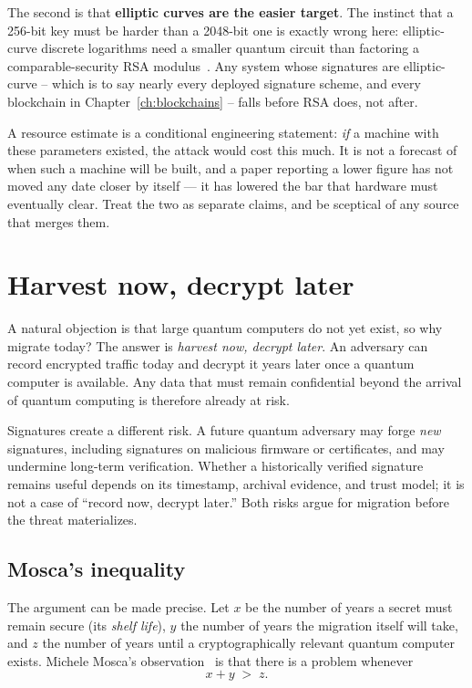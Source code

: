 The second is that \textbf{elliptic curves are the easier target}. The instinct
that a 256-bit key must be harder than a 2048-bit one is exactly wrong here:
elliptic-curve discrete logarithms need a smaller quantum circuit than factoring
a comparable-security RSA modulus~\cite{litinski2023}. Any system whose signatures
are elliptic-curve -- which is to say nearly every deployed signature scheme, and
every blockchain in Chapter~\ref{ch:blockchains} -- falls before RSA does, not
after.

\begin{remark}
A resource estimate is a conditional engineering statement: \emph{if} a machine
with these parameters existed, the attack would cost this much. It is not a
forecast of when such a machine will be built, and a paper reporting a lower
figure has not moved any date closer by itself --- it has lowered the bar that
hardware must eventually clear. Treat the two as separate claims, and be
sceptical of any source that merges them.
\end{remark}

\section{Harvest now, decrypt later}

A natural objection is that large quantum computers do not yet exist, so why migrate today? The answer is \emph{harvest now, decrypt later}. An adversary can record encrypted traffic today and decrypt it years later once a quantum computer is available. Any data that must remain confidential beyond the arrival of quantum computing is therefore already at risk.

Signatures create a different risk. A future quantum adversary may forge \emph{new} signatures, including signatures on malicious firmware or certificates, and may undermine long-term verification. Whether a historically verified signature remains useful depends on its timestamp, archival evidence, and trust model; it is not a case of ``record now, decrypt later.'' Both risks argue for migration before the threat materializes.

\subsection*{Mosca's inequality}

The argument can be made precise. Let $x$ be the number of years a secret must
remain secure (its \emph{shelf life}), $y$ the number of years the migration
itself will take, and $z$ the number of years until a cryptographically relevant
quantum computer exists. Michele Mosca's observation~\cite{mosca2025} is that
there is a problem whenever
\[
  x + y \;>\; z .
\]

